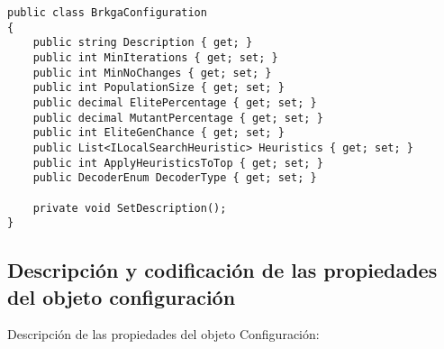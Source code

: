 \bigskip

\begin{minipage}{\textwidth}
\begin{lstlisting}
public class BrkgaConfiguration
{
	public string Description { get; }
	public int MinIterations { get; set; }
	public int MinNoChanges { get; set; }
	public int PopulationSize { get; set; }
	public decimal ElitePercentage { get; set; }
	public decimal MutantPercentage { get; set; }
	public int EliteGenChance { get; set; }
	public List<ILocalSearchHeuristic> Heuristics { get; set; }
	public int ApplyHeuristicsToTop { get; set; }
	public DecoderEnum DecoderType { get; set; }
	
	private void SetDescription();
}
\end{lstlisting}
\end{minipage}

\bigskip

\subsection{Descripción y codificación de las propiedades del objeto configuración}\label{sec:descrCongif}
Descripción de las propiedades del objeto Configuración:

